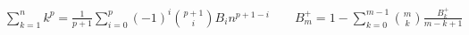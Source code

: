 $\sum_{k = 1}^ {n} k^ p = \frac{1} {p + 1}\sum_{i = 0}^ {p}(-1)^ i\binom{p + 1} {i} B_in^
{p + 1 - i} \quad \quad B_m ^ += 1 - \sum_{k = 0}^ {m - 1}\binom{m} {k}\frac{B_k ^ +} {m - k + 1}$
